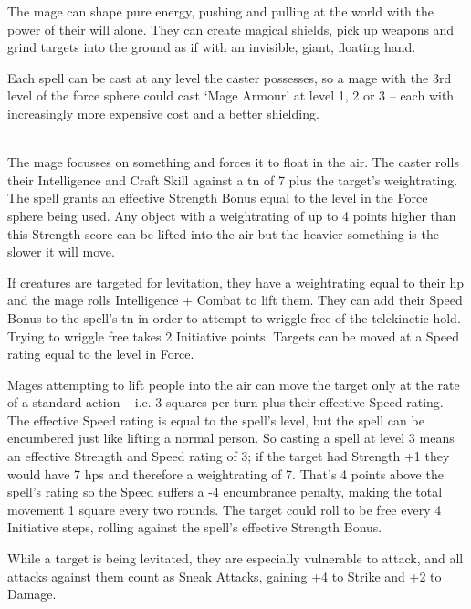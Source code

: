 \begin{multicols}{2}

\noindent
The mage can shape pure energy, pushing and pulling at the world with the power of their will alone. They can create magical shields, pick up weapons and grind targets into the ground as if with an invisible, giant, floating hand.

Each spell can be cast at any level the caster possesses, so a mage with the 3rd level of the force sphere could cast `Mage Armour' at level 1, 2 or 3 -- each with increasingly more expensive cost and a better shielding.

\spelllevel

\\
The mage focusses on something and forces it to float in the air.
The caster rolls their Intelligence and Craft Skill against a \gls{tn} of 7 plus the target's \gls{weightrating}.
The spell grants an effective Strength Bonus equal to the level in the Force sphere being used.
Any object with a \gls{weightrating} of up to 4 points higher than this Strength score can be lifted into the air but the heavier something is the slower it will move.

If creatures are targeted for levitation, they have a \gls{weightrating} equal to their \gls{hp} and the mage rolls Intelligence + Combat to lift them.
They can add their Speed Bonus to the spell's \gls{tn} in order to attempt to wriggle free of the telekinetic hold.
Trying to wriggle free takes 2 Initiative points.
Targets can be moved at a Speed rating equal to the level in Force.

Mages attempting to lift people into the air can move the target only at the rate of a standard action -- i.e. 3 squares per turn plus their effective Speed rating.
The effective Speed rating is equal to the spell's level, but the spell can be encumbered just like lifting a normal person.
So casting a spell at level 3 means an effective Strength and Speed rating of 3; if the target had Strength +1 they would have 7 \glspl{hp} and therefore a \gls{weightrating} of 7.
That's 4 points above the spell's rating so the Speed suffers a -4 encumbrance penalty, making the total movement 1 square every two \glspl{round}.
The target could roll to be free every 4 Initiative steps, rolling against the spell's effective Strength Bonus.

While a target is being levitated, they are especially vulnerable to attack, and all attacks against them count as Sneak Attacks, gaining +4 to Strike and +2 to Damage.


\end{multicols}
